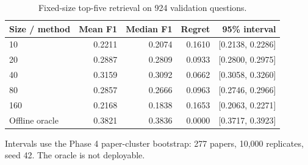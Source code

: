 \begin{table}[htbp]
\centering\small
\caption{Fixed-size top-five retrieval on 924 validation questions.}
\label{tab:fixedresults}
\begin{tabular}{@{}lrrrr@{}}
\toprule
Size / method & Mean F1 & Median F1 & Regret & 95\% interval\\
\midrule
10 & 0.2211 & 0.2074 & 0.1610 & [0.2138, 0.2286]\\
20 & 0.2887 & 0.2809 & 0.0933 & [0.2800, 0.2975]\\
40 & 0.3159 & 0.3092 & 0.0662 & [0.3058, 0.3260]\\
80 & 0.2857 & 0.2666 & 0.0963 & [0.2746, 0.2966]\\
160 & 0.2168 & 0.1838 & 0.1653 & [0.2063, 0.2271]\\
Offline oracle & 0.3821 & 0.3836 & 0.0000 & [0.3717, 0.3923]\\
\bottomrule
\end{tabular}
\par\smallskip\begin{minipage}{\textwidth}\footnotesize Intervals use the Phase 4 paper-cluster bootstrap: 277 papers, 10,000 replicates, seed 42. The oracle is not deployable.\end{minipage}
\end{table}
